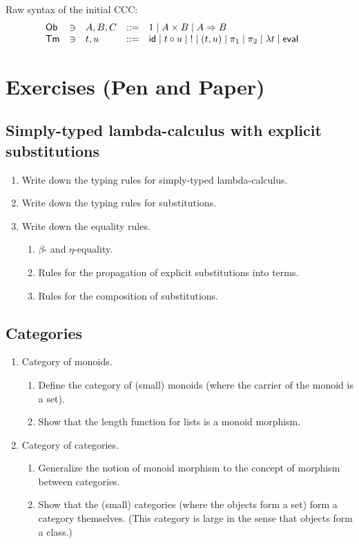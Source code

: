 \documentclass[a4paper,fleqn]{scrartcl}
\newcommand{\Ob}{\mathsf{Ob}}
\newcommand{\tid}{\mathsf{id}}
\newcommand{\comp}{\circ}
\newcommand{\To}{\Rightarrow}
\newcommand{\teval}{\mathsf{eval}}
\newcommand{\Tm}{\mathsf{Tm}}
\begin{document}
Raw syntax of the initial CCC:
\[
\begin{array}{lllrl@{\qquad}l}
\Ob & \ni & A,B,C & ::= & 1 \mid A \times B \mid A \To B \\
\Tm & \ni & t,u   & ::= & \tid \mid t \comp u \mid {!} \mid (t,u) \mid \pi_1 \mid \pi_2 \mid \lambda t \mid \teval \\
\end{array}
\]

\clearpage

\section{Exercises (Pen and Paper)}

\subsection{Simply-typed lambda-calculus with explicit substitutions}

\begin{enumerate}
\item Write down the typing rules for simply-typed lambda-calculus.
\item Write down the typing rules for substitutions.
\item Write down the equality rules.
  \begin{enumerate}
  \item $\beta$- and $\eta$-equality.
  \item Rules for the propagation of explicit substitutions into
    terms.
  \item Rules for the composition of substitutions.
  \end{enumerate}
\end{enumerate}

\subsection{Categories}

\begin{enumerate}

\item Category of monoids.
  \begin{enumerate}
  \item Define the category of (small) monoids (where the carrier of
    the monoid is a set).
  \item Show that the length function for lists is a monoid morphism.
  \end{enumerate}

\item Category of categories.
  \begin{enumerate}
  \item Generalize the notion of monoid morphism to the concept of
    morphism between categories.
  \item Show that the (small) categories (where the objects form a
    set) form a category themselves.  (This category is large in the
    sense that objects form a class.)
  \end{enumerate}

\end{enumerate}
\end{document}
